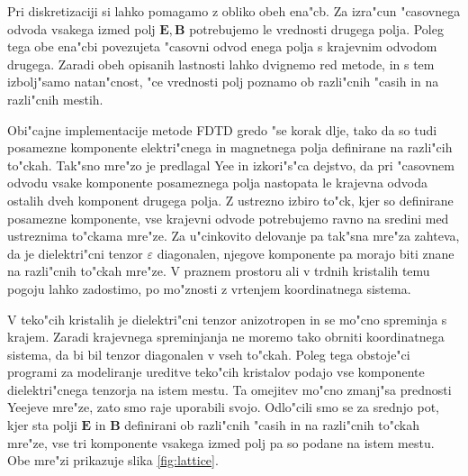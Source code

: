 \documentclass[12pt,twoside,openright,final]{report}
\renewcommand{\vec}{\mathbf}
\newcommand{\eps}{\varepsilon}
\newcommand{\E}{\vec E}
\newcommand{\B}{\vec B}
\begin{document}
Pri diskretizaciji si lahko pomagamo z obliko obeh ena"cb. 
Za izra"cun "casovnega odvoda vsakega izmed polj $\vec{E}, \vec{B}$ potrebujemo le vrednosti drugega polja. 
Poleg tega obe ena"cbi povezujeta "casovni odvod enega polja s krajevnim odvodom drugega. 
Zaradi obeh opisanih lastnosti lahko dvignemo red metode, in s tem izbolj"samo natan"cnost, "ce vrednosti polj poznamo ob razli"cnih "casih in na razli"cnih mestih\cite{taflove}. 

Obi"cajne implementacije metode \acs{FDTD} gredo "se korak dlje, tako da so tudi posamezne komponente elektri"cnega in magnetnega polja definirane na razli"cih to"ckah\cite{yee, yee-lattice}.
Tak"sno mre"zo je predlagal Yee in izkori"s"ca dejstvo, da pri "casovnem odvodu vsake komponente posameznega polja nastopata le krajevna odvoda ostalih dveh komponent drugega polja. 
Z ustrezno izbiro to"ck, kjer so definirane posamezne komponente, vse krajevni odvode potrebujemo ravno na sredini med ustreznima to"ckama mre"ze. 
Za u"cinkovito delovanje pa tak"sna mre"za zahteva, da je dielektri"cni tenzor $\eps$ diagonalen, njegove komponente pa morajo biti znane na razli"cnih to"ckah mre"ze. 
V praznem prostoru ali v trdnih kristalih temu pogoju lahko zadostimo, po mo"znosti z vrtenjem koordinatnega sistema.

V teko"cih kristalih je dielektri"cni tenzor anizotropen in se mo"cno spreminja s krajem. 
Zaradi krajevnega spreminjanja ne moremo tako obrniti koordinatnega sistema, da bi bil tenzor diagonalen v vseh to"ckah. 
Poleg tega obstoje"ci programi za modeliranje ureditve teko"cih kristalov podajo vse komponente dielektri"cnega tenzorja na istem mestu\cite{ravnik-zumer-ldg}.
Ta omejitev mo"cno zmanj"sa prednosti Yeejeve mre"ze, zato smo raje uporabili svojo. 
Odlo"cili smo se za srednjo pot, kjer sta polji $\E$ in $\B$ definirani ob razli"cnih "casih in na razli"cnih to"ckah mre"ze, vse tri komponente vsakega izmed polj pa so podane na istem mestu. 
Obe mre"zi prikazuje slika \ref{fig:lattice}. 
\end{document}
